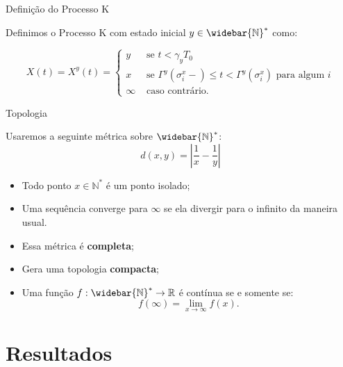 \documentclass[xcolor=pdftex,dvipsnames]{beamer}
\newcommand{\Nz}{{\mathbb{N^*}}}
\newcommand{\Nzb}{{\mathbb{\widebar{N}^*}}}
\newcommand{\R}{{\mathbb{R}}}
\begin{document}
\begin{frame}{Definição do Processo K}
  
  Definimos o Processo K com estado inicial $y \in \Nzb$ como:

  \begin{displaymath}
    X(t) = X^y (t) =
    \begin{cases}
      y & \textrm{ se }  t < \gamma_y T_0\\
      x & \textrm{ se } \Gamma^y(\sigma_i^x-) \leq t <
      \Gamma^y(\sigma^x_i)
      \textrm{ para algum } i \\
      \infty & \textrm{ caso contrário.}
    \end{cases}
  \end{displaymath}
\end{frame}

\begin{frame}{Topologia}
  
  Usaremos a seguinte métrica sobre $\Nzb$:
  \begin{displaymath}
    d(x, y) = \left\lvert \frac{1}{x} - \frac{1}{y} \right\rvert
  \end{displaymath}


  \begin{itemize}
  \item<2-> Todo ponto $x \in \Nz$ é um ponto isolado;
  \item<3-> Uma sequência converge para $\infty$ se ela divergir para o
    infinito da maneira usual.
  \item<4-> Essa métrica é {\bf completa};
  \item<5-> Gera uma topologia {\bf compacta};
  \item<6-> Uma função $f: \Nzb \to \R$ é contínua se e somente se:
    \begin{displaymath}
      f(\infty) = \lim_{x \to \infty} f(x) .
    \end{displaymath}
  \end{itemize}

\end{frame}

\section{Resultados}
\end{document}
